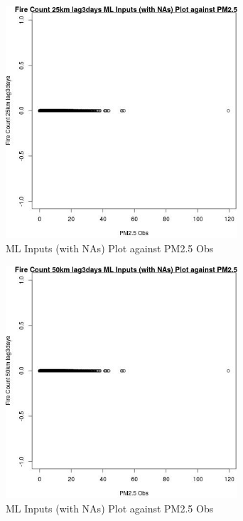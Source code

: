 \begin{figure} 
\centering  
\includegraphics[width=0.77\textwidth]{Code_Outputs/Report_ML_input_PM25_Step4_part_e_de_duplicated_aves_compiled_2019-05-18wNAs_Fire_Count_25km_lag3daysvPM25_Obs.jpg} 
\caption{\label{fig:Report_ML_input_PM25_Step4_part_e_de_duplicated_aves_compiled_2019-05-18wNAsFire_Count_25km_lag3daysvPM25_Obs}ML Inputs (with NAs) Plot against PM2.5 Obs} 
\end{figure} 
 

\begin{figure} 
\centering  
\includegraphics[width=0.77\textwidth]{Code_Outputs/Report_ML_input_PM25_Step4_part_e_de_duplicated_aves_compiled_2019-05-18wNAs_Fire_Count_50km_lag3daysvPM25_Obs.jpg} 
\caption{\label{fig:Report_ML_input_PM25_Step4_part_e_de_duplicated_aves_compiled_2019-05-18wNAsFire_Count_50km_lag3daysvPM25_Obs}ML Inputs (with NAs) Plot against PM2.5 Obs} 
\end{figure} 
 

